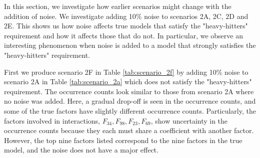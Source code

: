 In this section, we investigate how earlier scenarios might change with the addition of noise.
We investigate adding 10\% noise to scenarios 2A, 2C, 2D and 2E.
This shows us how noise affects true models that satisfy the "heavy-hitters" requirement and how it affects those that do not.
In particular, we observe an interesting phenomenon when noise is added to a model that strongly satisfies the "heavy-hitters" requirement.

First we produce scenario 2F in Table \ref{tab:scenario_2f} by adding 10\% noise to scenario 2A in Table \ref{tab:scenario_2a} which does not satisfy the "heavy-hitters" requirement.
The occurrence counts look similar to those from scenario 2A where no noise was added.
Here, a gradual drop-off is seen in the occurrence counts, and some of the true factors have slightly different occurrence counts.
Particularly, the factors involved in interactions, $F_{34}, F_{98}, F_{23}, F_{69}$, show uncertainty in the occurrence counts because they each must share a coefficient with another factor.
However, the top nine factors listed correspond to the nine factors in the true model, and the noise does not have a major effect.

